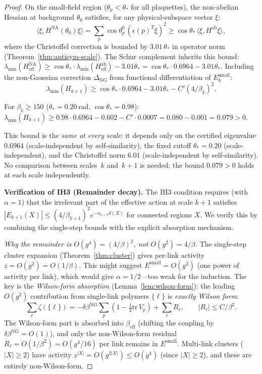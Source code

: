 \documentclass[11pt]{article}
\theoremstyle{definition}
\newcommand{\tr}{\mathrm{tr}}
\begin{document}
\begin{proof}
On the small-field region ($\theta_p<\theta_*$ for all plaquettes),
the non-abelian Hessian at background $\theta_0$ satisfies, for any
physical-subspace vector $\xi$:
\begin{equation}
\langle\xi,H^{\mathrm{NA}}(\theta_0)\xi\rangle
=\sum_p\cos\theta_p^0\,(\epsilon(p)^T\xi)^2
\ge\cos\theta_*\,\langle\xi,H^{\mathrm{ab}}\xi\rangle,
\end{equation}
where the Christoffel correction is bounded by
$3.01\,\theta_*$ in operator norm
(Theorem~\ref{thm:antisym-scale}).  The Schur complement inherits
this bound: $\lambda_{\min}(H_{\mathrm{eff}}^{\mathrm{NA}})
\ge\cos\theta_*\cdot\lambda_{\min}(H_{\mathrm{eff}}^{\mathrm{ab}})
-3.01\theta_*
=\cos\theta_*\cdot 0.6964-3.01\theta_*$.  Including the non-Gaussian correction
$\Delta_{\mathrm{NG}}$ from functional differentiation of
$E_k^{\mathrm{small}}$:
\begin{equation}
\lambda_{\min}(H_{k+1})
\ge\cos\theta_*\cdot 0.6964-3.01\theta_*-C'(4/\beta_k)^2.
\end{equation}

For $\beta_k\ge 150$ ($\theta_*=0.20$\,rad, $\cos\theta_*=0.98$):
$\lambda_{\min}(H_{k+1})\ge 0.98\cdot 0.6964-0.602-C'\cdot 0.0007
=0.080-0.001=0.079>0$.

This bound is the \emph{same at every scale}:
it depends only on the certified eigenvalue $0.6964$
(scale-independent by self-similarity), the fixed cutoff
$\theta_*=0.20$ (scale-independent), and the Christoffel norm $6.01$
(scale-independent by self-similarity).  No comparison between
scales~$k$ and~$k+1$ is needed; the bound $0.079>0$ holds at
each scale independently.

\medskip\noindent\textbf{Verification of IH3 (Remainder decay).}
The IH3 condition requires (with $\alpha=1$) that the irrelevant part
of the effective action at scale $k+1$ satisfies
$|E_{k+1}(X)|\le(4/\beta_{k+1})^{2}e^{-\kappa_{k+1} d(X)}$
for connected regions $X$.  We verify this by combining the
single-step bounds with the explicit absorption mechanism.

\emph{Why the remainder is $O(g^4)=(4/\beta)^2$, not $O(g^2)=4/\beta$.}
The single-step cluster expansion (Theorem~\ref{thm:cluster}) gives
per-link activity $z=O(g^2)=O(1/\beta)$.  This might suggest
$E^{\mathrm{small}}=O(g^2)$ (one power of activity per link), which
would give $\alpha=1/2$---too weak for the induction.
The key is the \emph{Wilson-form absorption}
(Lemma~\ref{lem:wilson-form}): the leading $O(g^2)$ contribution
from single-link polymers $\{\ell\}$ is \emph{exactly Wilson form}:
\begin{equation}
\sum_\ell\zeta(\{\ell\})
=-\delta\beta^{\mathrm{NG}}\sum_p(1-\tfrac{1}{2}\tr\,V_p)+
\sum_\ell R_\ell,
\qquad|R_\ell|\le C/\beta^2.
\end{equation}
The Wilson-form part is absorbed into $\beta_{\mathrm{eff}}$
(shifting the coupling by $\delta\beta^{\mathrm{NG}}=O(1)$), and only
the non-Wilson-form residual $R_\ell=O(1/\beta^2)=O(g^4/16)$ per link
remains in $E^{\mathrm{small}}$.  Multi-link clusters
($|X|\ge 2$) have activity $z^{|X|}=O(g^{2|X|})\le O(g^4)$ (since
$|X|\ge 2$), and these are entirely non-Wilson-form.


\end{proof}
\end{document}
